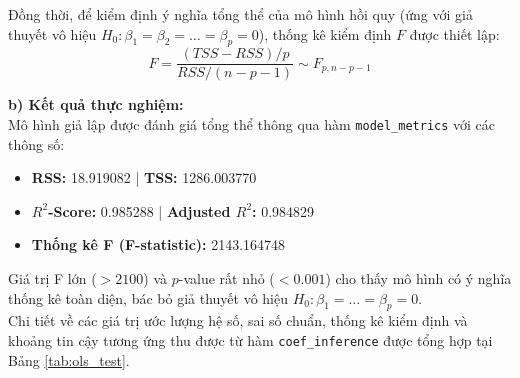 \documentclass[12pt,a4paper]{article}
\begin{document}
Đồng thời, để kiểm định ý nghĩa tổng thể của mô hình hồi quy (ứng với giả thuyết vô hiệu $H_0: \beta_1 = \beta_2 = \dots = \beta_p = 0$), thống kê kiểm định $F$ được thiết lập:
\begin{equation}
    F = \frac{(TSS - RSS) / p}{RSS / (n - p - 1)} \sim F_{p, n-p-1}
\end{equation}

\textbf{b) Kết quả thực nghiệm:} \\
Mô hình giả lập được đánh giá tổng thể thông qua hàm \texttt{model\_metrics} với các thông số:
\begin{itemize}
    \item \textbf{RSS:} 18.919082 \quad | \quad \textbf{TSS:} 1286.003770
    \item \textbf{$R^2$-Score:} 0.985288 \quad | \quad \textbf{Adjusted $R^2$:} 0.984829
    \item \textbf{Thống kê F (F-statistic):} 2143.164748
\end{itemize}

Giá trị F lớn ($>2100$) và $p$-value rất nhỏ ($<0.001$) cho thấy mô hình có ý nghĩa thống kê toàn diện, bác bỏ giả thuyết vô hiệu $H_0: \beta_1 = \dots = \beta_p = 0$. \\
Chi tiết về các giá trị ước lượng hệ số, sai số chuẩn, thống kê kiểm định và khoảng tin cậy tương ứng thu được từ hàm \texttt{coef\_inference} được tổng hợp tại Bảng \ref{tab:ols_test}.

\begin{table}[H]
    \centering
    \caption{Tổng hợp kết quả kiểm định hệ số hồi quy và khoảng tin cậy trên dữ liệu mô phỏng.}
    \label{tab:ols_test}
\end{table}
\end{document}
